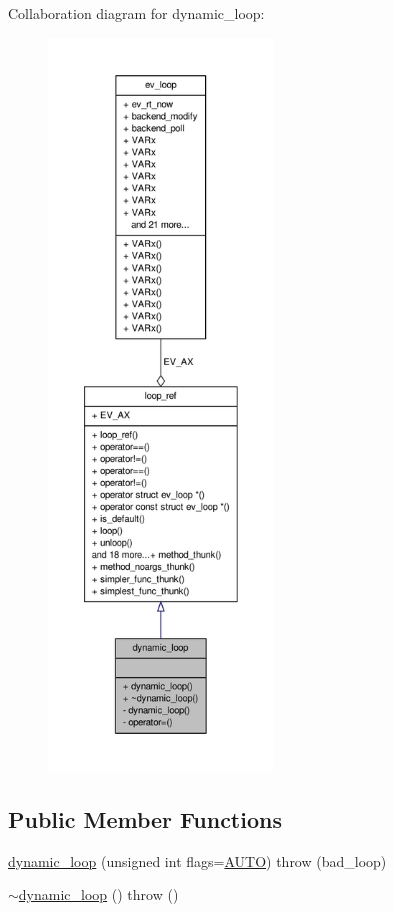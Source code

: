 \-Collaboration diagram for dynamic\-\_\-loop\-:
\nopagebreak
\begin{figure}[H]
\begin{center}
\leavevmode
\includegraphics[height=550pt]{structev_1_1dynamic__loop__coll__graph}
\end{center}
\end{figure}
\subsection*{\-Public \-Member \-Functions}
\begin{DoxyCompactItemize}
\item 
\hyperlink{structev_1_1dynamic__loop_ab88a248ea377d7ab6a90a417eba8f3ed}{dynamic\-\_\-loop} (unsigned int flags=\hyperlink{namespaceev_adf764cbdea00d65edcd07bb9953ad2b7aeef9468d1b98bca652a04bf5063fd9d6}{\-A\-U\-T\-O})  throw (bad\-\_\-loop)
\item 
\hyperlink{structev_1_1dynamic__loop_a7fbbd0b59052f5afc3bb615dd5f8323d}{$\sim$dynamic\-\_\-loop} ()  throw ()
\end{DoxyCompactItemize}

